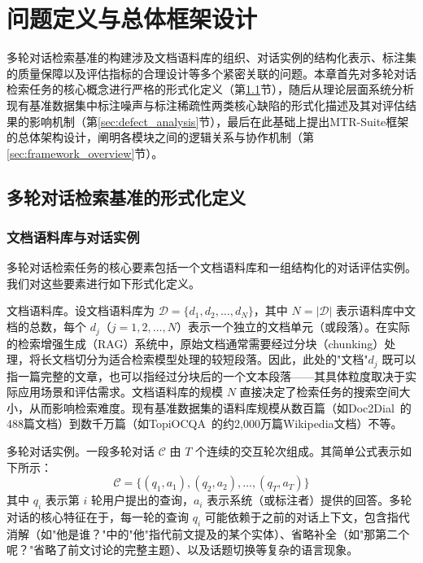 \chapter{问题定义与总体框架设计}

多轮对话检索基准的构建涉及文档语料库的组织、对话实例的结构化表示、标注集的质量保障以及评估指标的合理设计等多个紧密关联的问题。本章首先对多轮对话检索任务的核心概念进行严格的形式化定义（第\ref{sec:formal_definition}节），随后从理论层面系统分析现有基准数据集中标注噪声与标注稀疏性两类核心缺陷的形式化描述及其对评估结果的影响机制（第\ref{sec:defect_analysis}节），最后在此基础上提出MTR-Suite框架的总体架构设计，阐明各模块之间的逻辑关系与协作机制（第\ref{sec:framework_overview}节）。

\section{多轮对话检索基准的形式化定义}
\label{sec:formal_definition}

\subsection{文档语料库与对话实例}

多轮对话检索任务的核心要素包括一个文档语料库和一组结构化的对话评估实例。我们对这些要素进行如下形式化定义。

文档语料库。设文档语料库为 $\mathcal{D} = \{d_1, d_2, \dots, d_N\}$，其中 $N = |\mathcal{D}|$ 表示语料库中文档的总数，每个 $d_j$（$j = 1, 2, \dots, N$）表示一个独立的文档单元（或段落）。在实际的检索增强生成（RAG）系统中，原始文档通常需要经过分块（chunking）处理，将长文档切分为适合检索模型处理的较短段落。因此，此处的"文档"$d_j$ 既可以指一篇完整的文章，也可以指经过分块后的一个文本段落——其具体粒度取决于实际应用场景和评估需求。文档语料库的规模 $N$ 直接决定了检索任务的搜索空间大小，从而影响检索难度。现有基准数据集的语料库规模从数百篇（如Doc2Dial~\citep{feng-etal-2020-doc2dial}的488篇文档）到数千万篇（如TopiOCQA~\citep{adlakha-etal-2022-topiocqa}的约2,000万篇Wikipedia文档）不等。

多轮对话实例。一段多轮对话 $\mathcal{C}$ 由 $T$ 个连续的交互轮次组成。其简单公式表示如下所示：
\begin{equation}
    \mathcal{C} = \{(q_1, a_1), (q_2, a_2), \dots, (q_T, a_T)\}
\end{equation}
其中 $q_i$ 表示第 $i$ 轮用户提出的查询，$a_i$ 表示系统（或标注者）提供的回答。多轮对话的核心特征在于，每一轮的查询 $q_i$ 可能依赖于之前的对话上下文，包含指代消解（如"他是谁？"中的"他"指代前文提及的某个实体）、省略补全（如"那第二个呢？"省略了前文讨论的完整主题）、以及话题切换等复杂的语言现象。

